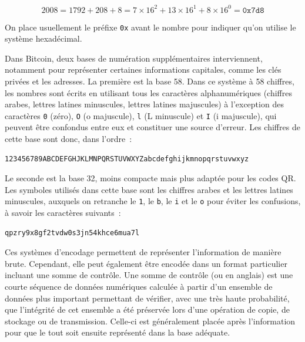{ \small
\[
2008 = 1792 + 208 + 8 = 7 \times 16^2 + 13 \times 16^1 + 8 \times 16^0 = \mathtt{0x7d8}
\]
}

On place usuellement le préfixe \texttt{0x} avant le nombre pour indiquer qu'on utilise le système hexadécimal.


Dans Bitcoin, deux bases de numération supplémentaires interviennent, notamment pour représenter certaines informations capitales, comme les clés privées et les adresses. La première est la base 58. Dans ce système à 58 chiffres, les nombres sont écrits en utilisant tous les caractères alphanumériques (chiffres arabes, lettres latines minuscules, lettres latines majuscules) à l'exception des caractères \texttt{0} (zéro), \texttt{O} (o majuscule), \texttt{l} (L minuscule) et \texttt{I} (i majuscule), qui peuvent être confondus entre eux et constituer une source d'erreur. Les chiffres de cette base sont donc, dans l'ordre~:

\begin{Verbatim}[fontsize=\small]
123456789ABCDEFGHJKLMNPQRSTUVWXYZabcdefghijkmnopqrstuvwxyz
\end{Verbatim}


Le seconde est la base 32, moins compacte mais plus adaptée pour les codes QR. Les symboles utilisés dans cette base sont les chiffres arabes et les lettres latines minuscules, auxquels on retranche le \texttt{1}, le \texttt{b}, le \texttt{i} et le \texttt{o} pour éviter les confusions, à savoir les caractères suivants~:

\begin{Verbatim}[fontsize=\small]
qpzry9x8gf2tvdw0s3jn54khce6mua7l
\end{Verbatim}


Ces systèmes d'encodage permettent de représenter l'information de manière brute. Cependant, elle peut également être encodée dans un format particulier incluant une somme de contrôle. Une somme de contrôle (ou  en anglais) est une courte séquence de données numériques calculée à partir d'un ensemble de données plus important permettant de vérifier, avec une très haute probabilité, que l'intégrité de cet ensemble a été préservée lors d'une opération de copie, de stockage ou de transmission. Celle-ci est généralement placée après l'information pour que le tout soit ensuite représenté dans la base adéquate.

